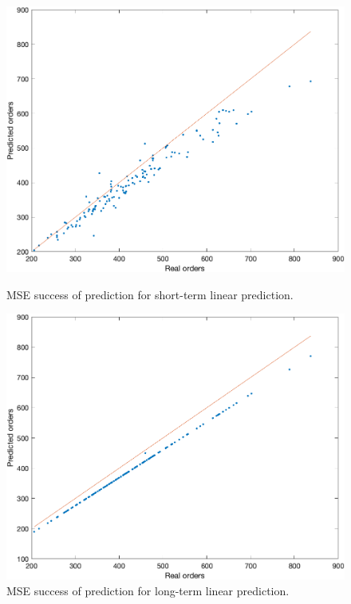         \begin{figure}[!ht]
            \begin{minipage}{0.45\textwidth}
                \centering
                \includegraphics[width=1\textwidth]{figures/expCompLP.png}
                \caption{MSE success of prediction for short-term linear prediction.}
                \label{fig:stlpres}
            \end{minipage}\hfill
            \begin{minipage}{0.45\textwidth}
                \centering
                \includegraphics[width=1\textwidth]{figures/expCompLTLP.png}
                \caption{MSE success of prediction for long-term linear prediction.}
                \label{fig:eltlpres}
            \end{minipage}\hfill
        \end{figure}

